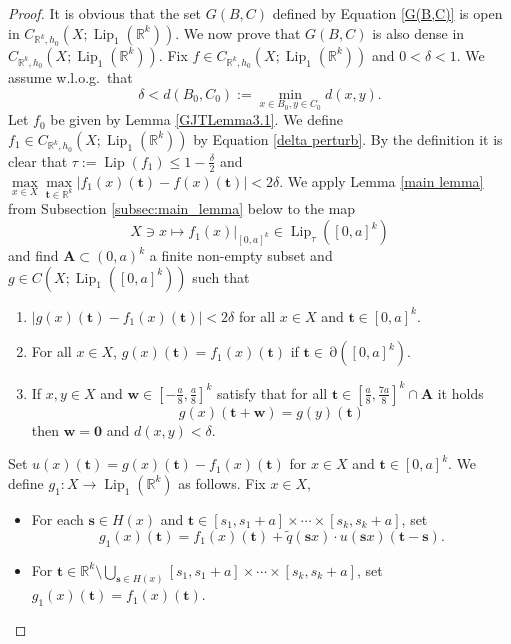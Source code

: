 \documentclass[11pt]{article}
\theoremstyle{plain}
\theoremstyle{definition}
\DeclareMathOperator{\Lip}{Lip}
\DeclareMathOperator{\Edge}{\partial}
\def\Rk{\mathbb{R}^k}
\def\tt{\mathbf t}
\def\ss{\mathbf s}
\def\AA{\mathbf A}
\numberwithin{figure}{section}
\begin{document}
\begin{proof}
 \noindent   It is obvious that the set $G(B,C)$ defined by Equation \eqref{G(B,C)} is open in $C_{\Rk,h_0}(X;\Lip_{1}(\Rk))$. We now prove that $G(B,C)$ is also dense in $C_{\Rk,h_0}(X;\Lip_{1}(\Rk))$. Fix $f\in C_{\Rk,h_0}(X;\Lip_{1}(\Rk))$ and $0<\delta<1$. We assume w.l.o.g.\ that 
    \begin{equation*}
        \delta<d(B_0,C_0):=\min\limits_{x\in B_0,y\in C_0}d(x,y).
    \end{equation*}
    Let $f_0$ be given by Lemma \ref{GJTLemma3.1}. We define $f_1\in C_{\Rk,h_0}(X;\Lip_{1}(\Rk))$ by Equation \eqref{delta perturb}. By the definition it is clear that $\tau:=\Lip(f_1)\leq1-\frac{\delta}{2}$ and $\max\limits_{x\in X}\max\limits_{\mathbf t\in\Rk}|f_1(x)(\tt)-f(x)(\tt)|<2\delta$. We apply Lemma \ref{main lemma} from Subsection \ref{subsec:main_lemma} below to the map
    \begin{equation*}
        X\ni x\mapsto f_1(x)|_{[0,a]^k}\in\Lip_{\tau}([0,a]^k)
    \end{equation*}
    and find $\AA \subset (0,a)^k$ a finite non-empty subset and $g\in C(X;\Lip_{1}([0,a]^k))$ such that
    \begin{enumerate}[$(1)$]
    \item  $|g(x)(\tt)-f_1(x)(\tt)|<2\delta$ for all $x\in X$ and $\mathbf t\in[0,a]^k$.
    \item  For all $x\in X$, $g(x)(\tt)=f_1(x)(\tt)$ if $\mathbf t\in\Edge([0,a]^k)$.
    \item If $x,y\in X$ and $\mathbf w\in[-\frac{a}{8},\frac{a}{8}]^k$ satisfy that for all $\tt \in\left[\frac{a}{8},\frac{7a}{8}\right]^k\cap \AA$  it holds 
   \begin{equation*}
       g(x)(\mathbf{t+w})=g(y)(\tt)
   \end{equation*}
   then $\mathbf w=\mathbf{0}$ and $d(x,y)<\delta$.
    \end{enumerate}
   Set $u(x)(\tt)=g(x)(\tt)-f_1(x)(\tt)$ for $x\in X$ and $\mathbf t\in[0,a]^k$. We define $g_1:X\to\Lip_{1}(\Rk)$ as follows. Fix $x\in X$,
    \begin{itemize}
        \item For each $\mathbf s\in H(x)$ and $\mathbf t\in[s_1,s_1+a]\times \cdots \times [s_k,s_k+a]$, set
        \begin{equation*}
            g_1(x)(\tt)=f_1(x)(\tt)+\widetilde{q}(\ss x)\cdot u(\ss x)(\tt-\mathbf s).
        \end{equation*}
        \item For $\mathbf t\in\Rk\setminus\bigcup\limits_{\mathbf s\in H(x)}[s_1,s_1+a]\times \cdots \times [s_k,s_k+a]$, set $g_1(x)(\tt)=f_1(x)(\tt)$.

\end{itemize}
\end{proof}
\end{document}
